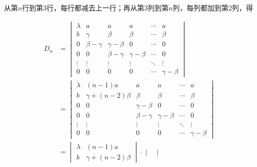 \documentclass[12pt,fontset=fandol]{ctexart}
\begin{document}
\begin{solve}
从第$n$行到第3行，每行都减去上一行；再从第3列到第$n$列，每列都加到第2列，得

            \begin{align*}
                D_n & =
                \begin{vmatrix}
                    \lambda & a            & a            & a            & \cdots & a            \\
                    b       & \gamma       & \beta        & \beta        & \cdots & \beta        \\
                    0       & \beta-\gamma & \gamma-\beta & 0            & \cdots & 0            \\
                    0       & 0            & \beta-\gamma & \gamma-\beta & \cdots & 0            \\
                    \vdots  & \vdots       & \vdots       & \vdots       & \ddots & \vdots       \\
                    0       & 0            & 0            & 0            & \cdots & \gamma-\beta
                \end{vmatrix}             \\
                    & =\begin{vmatrix}
                           \lambda & (n-1)a            & a            & a            & \cdots & a            \\
                           b       & \gamma+(n-2)\beta & \beta        & \beta        & \cdots & \beta        \\
                           0       & 0                 & \gamma-\beta & 0            & \cdots & 0            \\
                           0       & 0                 & \beta-\gamma & \gamma-\beta & \cdots & 0            \\
                           \vdots  & \vdots            & \vdots       & \vdots       & \ddots & \vdots       \\
                           0       & 0                 & 0            & 0            & \cdots & \gamma-\beta
                       \end{vmatrix} \\
                    & =\begin{vmatrix}
                           \lambda & (n-1)a            \\
                           b       & \gamma+(n-2)\beta
                       \end{vmatrix} \cdot \begin{vmatrix}

\end{vmatrix}
\end{align*}
\end{solve}
\end{document}
